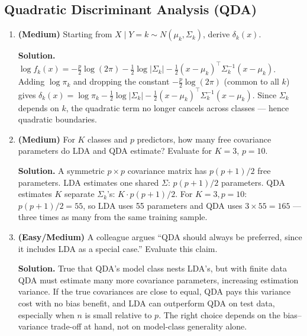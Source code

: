 \documentclass[11pt]{article}
\begin{document}
\subsection{Quadratic Discriminant Analysis (QDA)}
\begin{enumerate}
\item \textbf{(Medium)} Starting from $X\mid Y=k \sim N(\mu_k,\Sigma_k)$, derive $\delta_k(x)$.

\textbf{Solution.} $\log f_k(x) = -\tfrac{p}{2}\log(2\pi) - \tfrac12\log|\Sigma_k| - \tfrac12(x-\mu_k)^\top\Sigma_k^{-1}(x-\mu_k)$. Adding $\log\pi_k$ and dropping the constant $-\tfrac{p}{2}\log(2\pi)$ (common to all $k$) gives $\delta_k(x) = \log\pi_k - \tfrac12\log|\Sigma_k| - \tfrac12(x-\mu_k)^\top\Sigma_k^{-1}(x-\mu_k)$. Since $\Sigma_k$ depends on $k$, the quadratic term no longer cancels across classes --- hence quadratic boundaries.

\item \textbf{(Medium)} For $K$ classes and $p$ predictors, how many free covariance parameters do LDA and QDA estimate? Evaluate for $K=3$, $p=10$.

\textbf{Solution.} A symmetric $p\times p$ covariance matrix has $p(p+1)/2$ free parameters. LDA estimates one shared $\Sigma$: $p(p+1)/2$ parameters. QDA estimates $K$ separate $\Sigma_k$'s: $K\cdot p(p+1)/2$. For $K=3,p=10$: $p(p+1)/2=55$, so LDA uses 55 parameters and QDA uses $3\times55=165$ --- three times as many from the same training sample.

\item \textbf{(Easy/Medium)} A colleague argues ``QDA should always be preferred, since it includes LDA as a special case.'' Evaluate this claim.

\textbf{Solution.} True that QDA's model class nests LDA's, but with finite data QDA must estimate many more covariance parameters, increasing estimation variance. If the true covariances are close to equal, QDA pays this variance cost with no bias benefit, and LDA can outperform QDA on test data, especially when $n$ is small relative to $p$. The right choice depends on the bias--variance trade-off at hand, not on model-class generality alone.
\end{enumerate}
\end{document}
